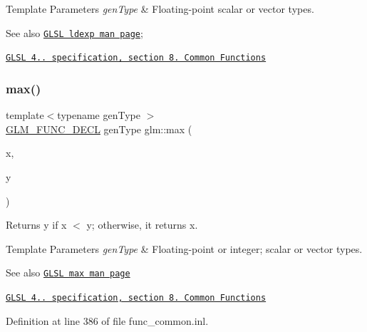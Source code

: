 \begin{DoxyTemplParams}{Template Parameters}
{\em gen\+Type} & Floating-\/point scalar or vector types.\\
\hline
\end{DoxyTemplParams}
\begin{DoxySeeAlso}{See also}
\href{http://www.opengl.org/sdk/docs/manglsl/xhtml/ldexp.xml}{\tt G\+L\+SL ldexp man page}; 

\href{http://www.opengl.org/registry/doc/GLSLangSpec.4.20.8.pdf}{\tt G\+L\+SL 4.. specification, section 8. Common Functions} 
\end{DoxySeeAlso}
\mbox{\label{group__core__func__common_gaa228561a9da55898f8f72ad2403fafac}} 
\subsubsection{\texorpdfstring{max()}{max()}\hspace{0.1cm}{\footnotesize\ttfamily [1/2]}}
{\footnotesize\ttfamily template$<$typename gen\+Type $>$ \\
\hyperlink{setup_8hpp_ab2d052de21a70539923e9bcbf6e83a51}{G\+L\+M\+\_\+\+F\+U\+N\+C\+\_\+\+D\+E\+CL} gen\+Type glm\+::max (\begin{DoxyParamCaption}\item[{gen\+Type const \&}]{x,  }\item[{gen\+Type const \&}]{y }\end{DoxyParamCaption})}

Returns y if x $<$ y; otherwise, it returns x.


\begin{DoxyTemplParams}{Template Parameters}
{\em gen\+Type} & Floating-\/point or integer; scalar or vector types.\\
\hline
\end{DoxyTemplParams}
\begin{DoxySeeAlso}{See also}
\href{http://www.opengl.org/sdk/docs/manglsl/xhtml/max.xml}{\tt G\+L\+SL max man page} 

\href{http://www.opengl.org/registry/doc/GLSLangSpec.4.20.8.pdf}{\tt G\+L\+SL 4.. specification, section 8. Common Functions} 
\end{DoxySeeAlso}


Definition at line 386 of file func\+\_\+common.\+inl.

